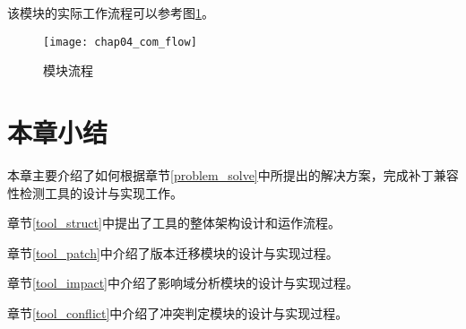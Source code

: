 该模块的实际工作流程可以参考图\ref {com_flow}。

\begin{figure}[H]
	\centering
	\texttt{[image: chap04\_com\_flow]}
	\caption {模块流程}
	\label {com_flow}	
\end{figure}


\section{本章小结}
本章主要介绍了如何根据章节\ref {problem_solve}中所提出的解决方案，完成补丁兼容性检测工具的设计与实现工作。

章节\ref {tool_struct}中提出了工具的整体架构设计和运作流程。

章节\ref {tool_patch}中介绍了版本迁移模块的设计与实现过程。

章节\ref {tool_impact}中介绍了影响域分析模块的设计与实现过程。

章节\ref {tool_conflict}中介绍了冲突判定模块的设计与实现过程。